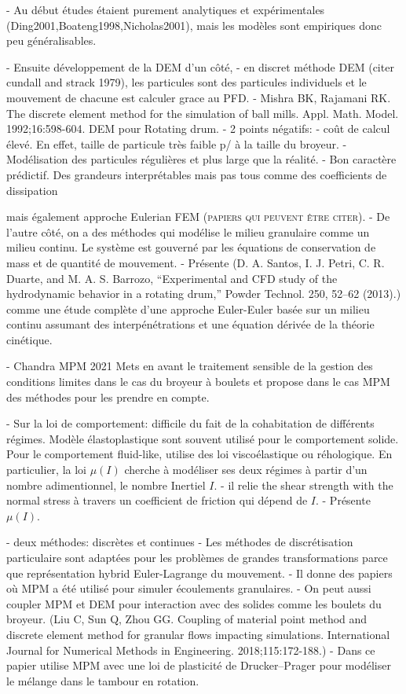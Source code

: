 - Au début études étaient purement analytiques et expérimentales (Ding2001,Boateng1998,Nicholas2001), mais les modèles sont empiriques donc peu généralisables.

- Ensuite développement de la DEM d'un côté,
- en discret méthode DEM (citer cundall and strack 1979), les particules sont des particules individuels et le mouvement de chacune est calculer grace au PFD.
- Mishra BK, Rajamani RK. The discrete element method for the simulation of ball mills. Appl. Math. Model. 1992;16:598-604. DEM pour Rotating drum.
- 2 points négatifs:
- coût de calcul élevé. En effet, taille de particule très faible p/ à la taille du broyeur.
- Modélisation des particules régulières et plus large que la réalité.
- Bon caractère prédictif. Des grandeurs interprétables mais pas tous comme des coefficients de dissipation

mais également approche Eulerian FEM (\textsc{papiers qui peuvent être citer}).
- De l'autre côté, on a des méthodes qui modélise le milieu granulaire comme un milieu continu. Le système est gouverné par les équations de conservation de mass et de quantité de mouvement.
- Présente (D. A. Santos, I. J. Petri, C. R. Duarte, and M. A. S. Barrozo, “Experimental and CFD study of the hydrodynamic behavior in a rotating drum,” Powder Technol. 250, 52–62 (2013).) comme une étude complète d'une approche Euler-Euler basée sur un milieu continu assumant des interpénétrations et une équation dérivée de la théorie cinétique.

- Chandra MPM 2021 Mets en avant le traitement sensible de la gestion des conditions limites dans le cas du broyeur à boulets et propose dans le cas MPM des méthodes pour les prendre en compte.

- Sur la loi de comportement: difficile du fait de la cohabitation de différents régimes. Modèle élastoplastique sont souvent utilisé pour le comportement solide. Pour le comportement fluid-like, utilise des loi viscoélastique ou réhologique. En particulier, la loi $\mu (I)$ cherche à modéliser ses deux régimes à partir d'un nombre adimentionnel, le nombre Inertiel $I$.
- il relie the shear strength with the normal stress à travers un coefficient de friction qui dépend de $I$.
- Présente $\mu(I)$.

- deux méthodes: discrètes et continues
- Les méthodes de discrétisation particulaire sont adaptées pour les problèmes de grandes transformations parce que représentation hybrid Euler-Lagrange du mouvement.
- Il donne des papiers où MPM a été utilisé pour simuler écoulements granulaires.
- On peut aussi coupler MPM et DEM pour interaction avec des solides comme les boulets du broyeur. (Liu C, Sun Q, Zhou GG. Coupling of material point method and discrete element method for granular flows impacting simulations. International Journal for Numerical Methods in Engineering. 2018;115:172-188.)
- Dans ce papier utilise MPM avec une loi de plasticité de Drucker–Prager pour modéliser le mélange dans le tambour en rotation.